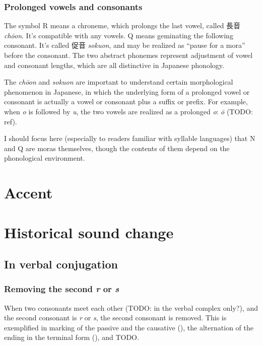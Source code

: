 \documentclass[UTF8, a4paper, oneside, scheme=plain]{ctexrep}
\newcommand{\corpus}[1]{\emph{#1}}
\begin{document}
\subsubsection{Prolonged vowels and consonants}

The symbol R means a chroneme,
which prolongs the last vowel,
called 長音 \corpus{chōon}.
It's compatible with any vowels.
Q means geminating the following consonant.
It's called 促音 \corpus{sokuon},
and may be realized as ``pause for a mora'' before the consonant. 
The two abstract phonemes represent adjustment of vowel and consonant lengths,
which are all distinctive in Japanese phonology.

The \corpus{ch\={o}on} and \corpus{sokuon} are important to understand 
certain morphological phenomenon in Japanese,
in which the underlying form of a prolonged vowel or consonant 
is actually a vowel or consonant plus a suffix or prefix.
For example, when \corpus{o} is followed by \corpus{u}, 
the two vowels are realized as a prolonged \corpus{o}: \corpus{\={o}}
(TODO: ref).

I should focus here (especially to readers familiar with syllable languages)
that N and Q are moras themselves,
though the contents of them depend on the phonological environment.

\section{Accent}

\section{Historical sound change}

\subsection{In verbal conjugation}

\subsubsection{Removing the second \corpus{r} or \corpus{s}}\label{sec:removing-rs}

When two consonants meet each other (TODO: in the verbal complex only?),
and the second consonant is \corpus{r} or \corpus{s},
the second consonant is removed.
This is exemplified in marking of the passive and the causative (),
the alternation of the ending in the terminal form (),
and TODO.
\end{document}
